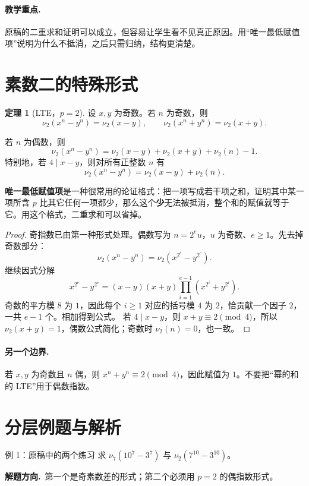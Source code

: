 \documentclass[UTF8,a4paper,11pt,twoside,openright,fontset=fandol]{ctexbook}
\theoremstyle{definition}
\newtheorem{theorem}[definition]{定理}
\newcommand{\hint}{\par\noindent\textbf{解题方向.}\ }
\begin{document}
\paragraph{教学重点.} 原稿的二重求和证明可以成立，但容易让学生看不见真正原因。用“唯一最低赋值项”说明为什么不抵消，之后只需归纳，结构更清楚。


\section{素数二的特殊形式}
\begin{theorem}[LTE，$p=2$]
设 $x,y$ 为奇数。若 $n$ 为奇数，则
\[
 \nu_2(x^n-y^n)=\nu_2(x-y),\qquad
 \nu_2(x^n+y^n)=\nu_2(x+y).
\]


若 $n$ 为偶数，则
\[
 \nu_2(x^n-y^n)=\nu_2(x-y)+\nu_2(x+y)+\nu_2(n)-1.
\]
特别地，若 $4\mid x-y$，则对所有正整数 $n$ 有
\[
 \nu_2(x^n-y^n)=\nu_2(x-y)+\nu_2(n).
\]
\end{theorem}

\begin{tip}[方法：唯一最低赋值项]
\textbf{唯一最低赋值项}是一种很常用的论证格式：把一项写成若干项之和，证明其中某一项所含 $p$ 比其它任何一项都少，那么这个\textbf{少}无法被抵消，整个和的赋值就等于它。用这个格式，二重求和可以省掉。
\end{tip}


\begin{proof}
奇指数已由第一种形式处理。偶数写为 $n=2^e u$，$u$ 为奇数、$e\ge1$。先去掉奇数部分：
\[
\nu_2(x^n-y^n)=\nu_2(x^{2^e}-y^{2^e}).
\]
继续因式分解
\[
 x^{2^e}-y^{2^e}=(x-y)(x+y)\prod_{i=1}^{e-1}(x^{2^i}+y^{2^i}).
\]
奇数的平方模 $8$ 为 $1$，因此每个 $i\ge1$ 对应的括号模 $4$ 为 $2$，恰贡献一个因子 $2$，一共 $e-1$ 个。相加得到公式。
若 $4\mid x-y$，则 $x+y\equiv2\pmod4$，所以 $\nu_2(x+y)=1$，偶数公式简化；奇数时 $\nu_2(n)=0$，也一致。
\end{proof}
\paragraph{另一个边界.} 若 $x,y$ 为奇数且 $n$ 偶，则 $x^n+y^n\equiv2\pmod4$，因此赋值为 $1$。不要把“幂的和的 LTE”用于偶数指数。


\section{分层例题与解析}
\begin{problem}{例 1：原稿中的两个练习}
求 $\nu_7(10^7-3^7)$ 与 $\nu_2(7^{10}-3^{10})$。
\end{problem}
\hint 第一个是奇素数差的形式；第二个必须用 $p=2$ 的偶指数形式。
\end{document}
